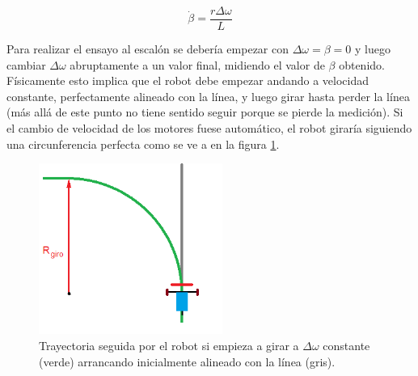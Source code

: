 \documentclass[10pt,conference,a4paper,onecolumn]{article}%
\begin{document}
\begin{equation}
\dot{\beta}= \frac{r\Delta\omega}{L} 
\label{eq:sys_tot_teo} 
\end{equation}

Para realizar el ensayo al escalón se debería empezar con $\Delta \omega = \beta = 0$  y luego cambiar $\Delta \omega$  abruptamente a un valor final, midiendo el valor de $\beta$ obtenido. Físicamente esto implica que el robot debe empezar andando a velocidad constante, perfectamente alineado con la línea, y luego girar hasta perder la línea (más allá de este punto no tiene sentido seguir porque se pierde la medición).
Si el cambio de velocidad de los motores fuese automático, el robot giraría siguiendo una circunferencia perfecta como se ve a en la figura \ref{fig:carritoEsc}.
\begin{figure}[h!]
\centering
\includegraphics[width=6cm]{./imagenes/carrito_Ensayo_escalon.png}
\caption{Trayectoria seguida por el robot si empieza a girar a $\Delta \omega $ constante (verde) arrancando inicialmente alineado con la línea (gris).}
\label{fig:carritoEsc}
\end{figure}
\end{document}
